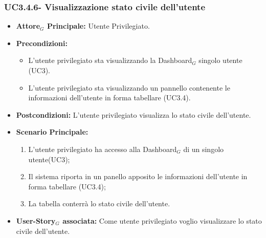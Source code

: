 \documentclass[11pt]{article}
\begin{document}
\begin{justify}
\subsubsection{\textbf{UC3.4.6- Visualizzazione stato civile dell'utente}}
\label{UC3.4.6}
\begin{itemize}
     \item \textbf{Attore$_G$ Principale:} Utente Privilegiato.
     \item \textbf{Precondizioni:}
        \begin{itemize}
    	\item L'utente privilegiato sta visualizzando la Dashboard$_G$ singolo utente (UC3).
          \item L'utente privilegiato sta visualizzando un pannello contenente le informazioni dell'utente in forma tabellare (UC3.4).
        \end{itemize}
      \item \textbf{Postcondizioni:} L'utente privilegiato visualizza lo stato civile dell'utente. 
      \item \textbf{Scenario Principale:}
        \begin{enumerate}
            \item L'utente privilegiato ha accesso alla Dashboard$_G$ di un singolo utente(UC3);
            \item Il sistema riporta  in un panello apposito le informazioni dell'utente in forma tabellare (UC3.4);
            \item La tabella conterrà lo stato civile dell'utente.
        \end{enumerate}
     \item \textbf{User-Story$_G$ associata:}
       Come utente privilegiato voglio visualizzare lo stato civile dell'utente.
\end{itemize}


\end{justify}
\end{document}
